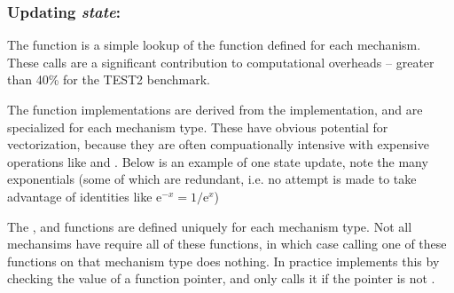 \subsubsection{Updating \emph{state}: }
The  function is a simple lookup of the  function defined for each mechanism. These calls are a significant contribution to computational overheads -- greater than 40\% for the TEST2 benchmark.


The  function implementations are derived from the \hoc implementation, and are specialized for each mechanism type. These have obvious potential for vectorization, because they are often compuationally intensive with expensive operations like  and . Below is an example of one state update, note the many exponentials (some of which are redundant, i.e. no attempt is made to take advantage of identities like $\text{e}^{-x}=1/\text{e}^{x}$)


\begin{note}
    The ,  and  functions are defined uniquely for each mechanism type. Not all mechansims have require all of these functions, in which case calling one of these functions on that mechanism type does nothing. In practice \neuron implements this by checking the value of a function pointer, and only calls it if the pointer is not .
\end{note}
